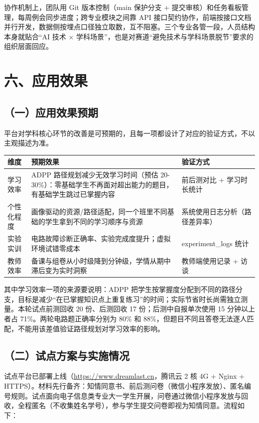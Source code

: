 \documentclass[zihao=-4,a4paper,UTF8,fontset=windows]{ctexart}
\begin{document}
协作机制上，团队用 Git 版本控制（main 保护分支 + 提交审核）和任务看板管理，每周例会同步进度；跨专业模块之间靠 API 接口契约协作，前端按接口文档并行开发，数据侧按埋点口径独立取数，互不阻塞。三个专业各管一段，人员结构本身就贴合“AI 技术 × 学科场景”，也是对赛道“避免技术与学科场景脱节”要求的组织层面回应。

\section{六、应用效果}
\subsection{（一）应用效果预期}


平台对学科核心环节的改善是可预期的，且每一项都设计了对应的验证方式，不以主观描述为准。

\par\noindent\begin{tabular}{|p{3.0cm}|p{4.5cm}|p{6.2cm}|}
\hline
\textbf{维度} & \textbf{预期效果} & \textbf{验证方式} \\ \hline
学习效率 & ADPP 路径规划减少无效学习时间（预估 20-30\%）：零基础学生不再面对超出能力的题目，有基础学生跳过已掌握内容 & 前后测对比 + 学习时长统计 \\ \hline
个性化程度 & 画像驱动的资源/路径适配，同一个班里不同基础的学生拿到不同的学习顺序与资源 & 系统使用日志分析（路径差异率） \\ \hline
实验实训 & 电路故障诊断正确率、实验完成度提升；虚拟环境试错零成本 & experiment\_logs 统计 \\ \hline
教师效率 & 备课与组卷从小时级降到分钟级，学情从期中滞后变为实时洞察 & 教师端使用记录 + 访谈 \\ \hline
\end{tabular}\par


其中学习效率一项的来源要说明：ADPP 把学生按掌握度分配到不同的路径分支，目标是减少“在已掌握知识点上重复练习”的时间；实际节省时长尚需独立测量。本轮试点前测回收 20 份、后测回收 17 份；后测中自报单次使用 15 分钟以上者占 71\%。两轮电路题正确率分别为 80\% 和 88\%，但题目不同且答卷无法逐人匹配，不能用该差值验证路径规划对学习效率的影响。

\subsection{（二）试点方案与实施情况}


试点平台已部署上线（\url{https://www.dreamlast.cn}，腾讯云 2 核 4G + Nginx + HTTPS）。材料先行备齐：知情同意书、前后测问卷（微信小程序发放）、匿名编号规则。试点面向电子信息类专业大一学生开展，问卷通过微信小程序发放与回收，全程匿名（不收集姓名学号），参与学生提交问卷即视为知情同意。流程如下：
\end{document}
